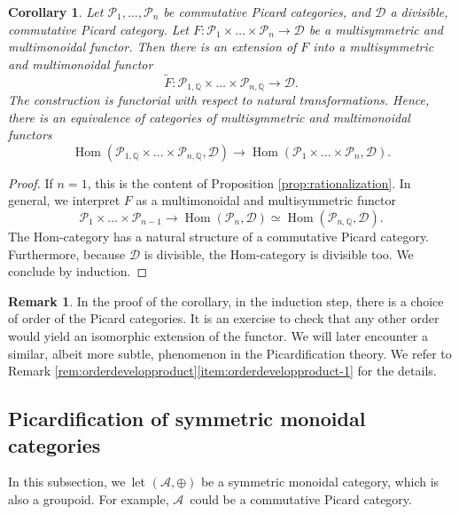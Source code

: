 \documentclass[JEP,XML,SOM,Unicode,published]{cedram}
\theoremstyle{plain}
\newtheorem{corollary}[theorem]{Corollary}
\theoremstyle{definition}
\newtheorem{remark}[theorem]{Remark}
\newcommand{\QBbb}{\mathbb Q}
\newcommand{\Acal}{\mathcal A}
\newcommand{\Dcal}{\mathcal D}
\newcommand{\Pcal}{\mathcal P}
\DeclareMathOperator{\Hom}{Hom}
\begin{document}
\begin{corollary}\label{cor:rationalization}
Let $\Pcal_{1},\ldots,\Pcal_{n}$ be commutative Picard categories, and $\Dcal$ a divisible, commutative Picard category. Let $F\colon \Pcal_{1}\times\ldots\times\Pcal_{n}\to\Dcal$ be a multisymmetric and multimonoidal functor. Then there is an extension of $F$ into a multisymmetric and multimonoidal functor
\begin{displaymath}
\widetilde{F}\colon \Pcal_{1,\QBbb}\times\ldots \times \Pcal_{n,\QBbb}\to \Dcal.
\end{displaymath}
The construction is functorial with respect to natural transformations. Hence, there is an equivalence of categories of multisymmetric and multimonoidal functors
\begin{displaymath}
\Hom(\Pcal_{1,\QBbb}\times\ldots\times\Pcal_{n,\QBbb},\Dcal)\to\Hom(\Pcal_{1}\times\ldots\times\Pcal_{n},\Dcal).
\end{displaymath}
\end{corollary}
\begin{proof}
If $n=1$, this is the content of Proposition \ref{prop:rationalization}. In general, we interpret $F$ as a multimonoidal and multisymmetric functor
\[
\Pcal_{1}\times\ldots\times\Pcal_{n-1}\to\Hom(\Pcal_{n},\Dcal)\simeq\Hom(\Pcal_{n,\QBbb},\Dcal).
\]
The Hom-category has a natural structure of a commutative Picard category. Furthermore, because $\Dcal$ is divisible, the Hom-category is divisible too. We conclude by induction.
\end{proof}
\begin{remark}\label{rmk:order-rationalization}
In the proof of the corollary, in the induction step, there is a choice of order of the Picard categories. It is an exercise to check that any other order would yield an isomorphic extension of the functor. We will later encounter a similar, albeit more subtle, phenomenon in the Picardification theory. We refer to Remark \ref{rem:orderdevelopproduct}\eqref{item:orderdevelopproduct-1} for the details.
\end{remark}

\subsection{Picardification of symmetric monoidal categories}\label{subsubsec:picardification}
In this subsection, we~let $(\Acal,\oplus)$ be a symmetric monoidal category, which is also a groupoid. For example, $\Acal$~could be a commutative Picard category.
\end{document}
